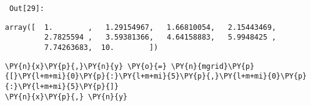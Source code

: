         {\par%
        \vspace{-1\smallerfontscale}%
        \noindent%
        \begin{minipage}{\cellleftmargin}%
    \hfill%
    {\smaller%
    \tt%
    \color{nbframe-out-prompt}%
    Out[29]:}%
    \hspace{\inputpadding}%
    \hspace{0em}%
    \hspace{3pt}%
    \end{minipage}%
        }%
    \begin{addmargin}[\cellleftmargin]{0em}%
    {\smaller%
    \vspace{-1\smallerfontscale}%
    
    
    
    \begin{verbatim}
array([  1.        ,   1.29154967,   1.66810054,   2.15443469,
         2.7825594 ,   3.59381366,   4.64158883,   5.9948425 ,
         7.74263683,  10.        ])
    \end{verbatim}

    
}%
    \end{addmargin}%

{\par%
\vspace{-1\baselineskip}%
}%
\begin{notebookcell}[30]%
\begin{addmargin}[\cellleftmargin]{0em}%
{\smaller%
\par%
%
\vspace{-1\smallerfontscale}%
\begin{Verbatim}[commandchars=\\\{\}]
\PY{n}{x}\PY{p}{,}\PY{n}{y} \PY{o}{=} \PY{n}{mgrid}\PY{p}{[}\PY{l+m+mi}{0}\PY{p}{:}\PY{l+m+mi}{5}\PY{p}{,}\PY{l+m+mi}{0}\PY{p}{:}\PY{l+m+mi}{5}\PY{p}{]}
\PY{n}{x}\PY{p}{,} \PY{n}{y}
\end{Verbatim}
%
\par%
\vspace{-1\smallerfontscale}}%
\end{addmargin}
\end{notebookcell}

\par\vspace{1\smallerfontscale}%
    
